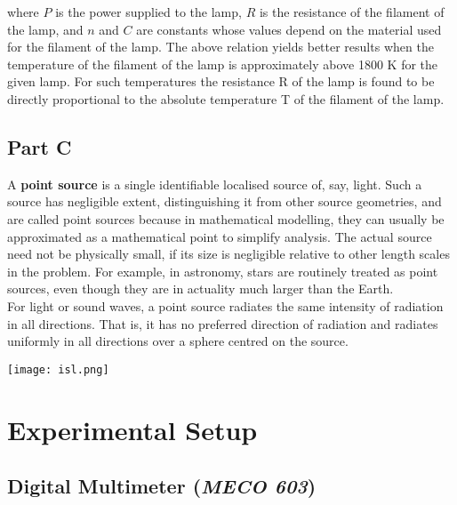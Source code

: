 where $P$ is the power supplied to the lamp, $R$ is the resistance of the filament of the lamp, and $n$ and $C$ are constants whose values depend on the material used for the filament of the lamp. The above relation yields better results when the temperature of the filament of the lamp is approximately above 1800 K for the given lamp. For such temperatures the resistance R of the lamp is found to be directly proportional to the absolute temperature T of the filament of the lamp.



\subsection*{Part C}


\begin{minipage}{0.5\linewidth}
A \textbf{point source} is a single identifiable localised source of, say, light. Such a source has negligible extent, distinguishing it from other source geometries, and are called point sources because in mathematical modelling, they can usually be approximated as a mathematical point to simplify analysis. The actual source need not be physically small, if its size is negligible relative to other length scales in the problem. For example, in astronomy, stars are routinely treated as point sources, even though they are in actuality much larger than the Earth.~\\

For light or sound waves, a point source radiates the same intensity of radiation in all directions. That is, it has no preferred direction of radiation and radiates uniformly in all directions over a sphere centred on the source.
\end{minipage}
\begin{minipage}{0.5\linewidth}
\centering
\texttt{[image: isl.png]}
\end{minipage}



\section*{Experimental Setup}

\subsection*{Digital Multimeter (\textit{MECO 603})}

